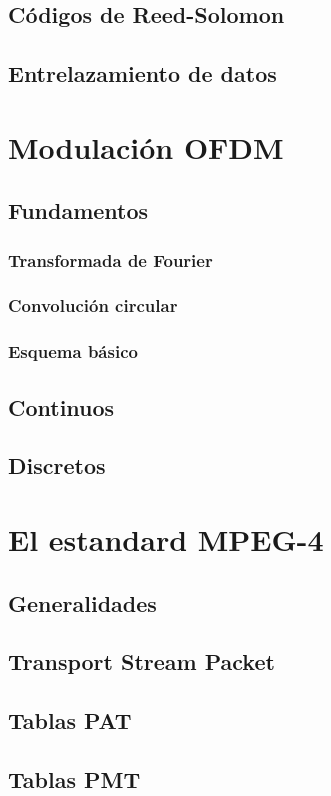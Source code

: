 	\subsection{C\'odigos de Reed-Solomon}
	\subsection{Entrelazamiento de datos}

\section{Modulación OFDM}

	\subsection{Fundamentos}
		\subsubsection{Transformada de Fourier}
		\subsubsection{Convoluci\'on circular}
		\subsubsection{Esquema b\'asico}
	
	\subsection{Continuos}

	\subsection{Discretos}

\section{El estandard MPEG-4}
	\subsection{Generalidades}
	\subsection{Transport Stream Packet}
	\subsection{Tablas PAT}
	\subsection{Tablas PMT}

